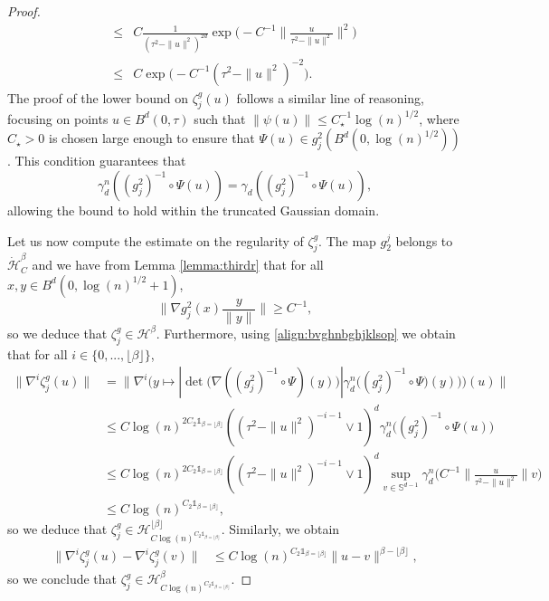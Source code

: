 \documentclass[10pt]{article}
\begin{document}
\begin{proof}
\begin{align*}
    \leq & C\frac{1}{(\tau^2-\|u\|^2)^{2d}} \exp\big(-C^{-1}\|\frac{u}{\tau^2-\|u\|^2}\|^2\big)\\
    \leq & C \exp\big(-C^{-1}(\tau^2-\|u\|^2)^{-2}\big).
\end{align*}
The proof of the lower bound on \( \zeta_j^g(u) \) follows a similar line of reasoning, focusing on points \( u \in B^d(0, \tau) \) such that \( \|\psi(u)\| \leq C_\star^{-1} \log(n)^{1/2} \), where \( C_\star > 0 \) is chosen large enough to ensure that \( \Psi(u) \in g_j^2(B^d(0, \log(n)^{1/2})) \). This condition guarantees that
\[
\gamma_d^n\left((g_j^2)^{-1} \circ \Psi(u)\right) = \gamma_d\left((g_j^2)^{-1} \circ \Psi(u)\right),
\]
allowing the bound to hold within the truncated Gaussian domain.


Let us now compute the estimate on the regularity of $\zeta_j^g$.
The map $g_2^j$ belongs to $\dot{\mathcal{H}}^{\beta}_C$ and  we have from Lemma  \ref{lemma:thirdr} that for all $x,y\in B^d(0,\log(n)^{1/2}+1)$,
$$\|\nabla g_j^2(x)\frac{y}{\|y\|}\|\geq C^{-1},$$
so we deduce that $\zeta^g_j\in \mathcal{H}^\beta$. Furthermore, using \eqref{align:bvghnbghjklsop} we obtain that for all $i\in \{0,...,\lfloor \beta\rfloor\}$,
\begin{align*}
\|\nabla^i \zeta_j^g(u)\|& = \|\nabla^i\Big(y\mapsto |\det\big(\nabla( (g_j^2)^{-1}\circ \Psi) (y)\big)|\gamma_d^n\big((g_j^2)^{-1}\circ \Psi) (y)\big)\Big)(u)\|\\
&  \leq C\log(n)^{2C_2\mathds{1}_{\beta=\lfloor \beta \rfloor}}
    ((\tau^2-\|u\|^2)^{-i-1}\vee 1 )^d\gamma_d^n\big((g_j^2)^{-1} \circ\Psi(u)\big)\\
    &  \leq C\log(n)^{2C_2\mathds{1}_{\beta=\lfloor \beta \rfloor}}
    ((\tau^2-\|u\|^2)^{-i-1}\vee 1 )^d\sup_{v\in \mathbb{S}^{d-1}}\gamma_d^n\big(C^{-1}\|\frac{u}{\tau^2-\|u\|^2}\|v\big)\\
    &\leq C\log(n)^{C_2\mathds{1}_{\beta=\lfloor \beta \rfloor}},
\end{align*}
so we deduce that $\zeta^g_j\in \mathcal{H}^{\lfloor \beta \rfloor}_{C\log(n)^{C_2\mathds{1}_{\beta=\lfloor \beta \rfloor}}}.$ Similarly, we obtain
\begin{align*}
\|\nabla^i \zeta_j^g(u)-\nabla^i \zeta_j^g(v)\|
    &\leq C\log(n)^{C_2\mathds{1}_{\beta=\lfloor \beta \rfloor}}\|u-v\|^{\beta-\lfloor \beta \rfloor},
\end{align*}
so we conclude that $\zeta^g_j\in \mathcal{H}^{ \beta }_{C\log(n)^{C_2\mathds{1}_{\beta=\lfloor \beta \rfloor}}}.$


\end{proof}
\end{document}
